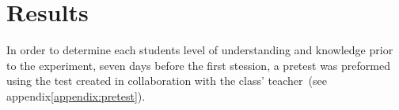 \chapter{Results}
In order to determine each students level of understanding and knowledge prior to the experiment, seven days before the first stession, a pretest was preformed using the test created in collaboration with the class' teacher~(see appendix\ref{appendix:pretest}).

\bigskip\noindent
\begin{table}[H]
\end{table}